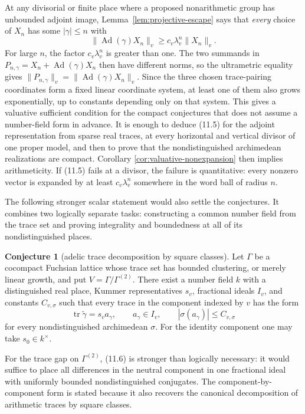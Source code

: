 \documentclass[11pt,reqno]{amsart}
\theoremstyle{definition}
\newtheorem{conjecture}[theorem]{Conjecture}
\theoremstyle{remark}
\newcommand{\Tr}{\operatorname{tr}}
\newcommand{\Ad}{\operatorname{Ad}}
\begin{document}
At any divisorial or finite place where a proposed nonarithmetic group has
unbounded adjoint image, Lemma~\ref{lem:projective-escape} says that
\emph{every} choice of
\(X_n\) has some \(|\gamma|\le n\) with
\[
 \|\Ad(\gamma)X_n\|_v\ge c_v\lambda_v^n\|X_n\|_v.
\]
For large \(n\), the factor \(c_v\lambda_v^n\) is greater than one.  The two
summands in
\(P_{n,\gamma}=X_n+\Ad(\gamma)X_n\) then have different norms, so the
ultrametric equality gives
\(\|P_{n,\gamma}\|_v=\|\Ad(\gamma)X_n\|_v\).  Since the three chosen
trace-pairing coordinates form a fixed linear coordinate system, at least
one of them
also grows exponentially, up to constants depending only on that system.
This gives a valuative sufficient condition for the compact conjectures that
does not assume a number-field form in advance.  It is enough to deduce
(11.5) for the adjoint representation from sparse real traces, at every
horizontal and vertical divisor of one proper model, and then to prove that
the nondistinguished archimedean realizations are compact.  Corollary
\ref{cor:valuative-nonexpansion} then implies arithmeticity.  If (11.5)
fails at a divisor, the failure is quantitative: every nonzero vector is
expanded by at least \(c_v\lambda_v^n\) somewhere in the word ball of
radius \(n\).

The following stronger scalar statement would also settle the conjectures.
It combines two logically separate tasks: constructing a common number
field from the trace set and proving integrality and boundedness at all of
its nondistinguished places.

\begin{conjecture}[adelic trace decomposition by square classes]\label{conj:window}
Let \(\Gamma\) be a cocompact Fuchsian lattice whose trace set has bounded
clustering, or merely linear growth, and put
\(V=\Gamma/\Gamma^{(2)}\).  There exist a number field \(k\) with a
distinguished real place, Kummer representatives \(s_v\), fractional ideals
\(I_v\), and constants \(C_{v,\sigma}\) such that every trace in the
component indexed by \(v\)
has the form
\[
 \Tr\widetilde\gamma=s_v a_\gamma,
 \qquad a_\gamma\in I_v,
 \qquad |\sigma(a_\gamma)|\le C_{v,\sigma}
\tag{11.6}
\]
for every nondistinguished archimedean \(\sigma\).  For the identity
component one
may take \(s_0\in k^\times\).
\end{conjecture}

For the trace gap on \(\Gamma^{(2)}\), (11.6) is stronger than logically
necessary: it would suffice to place all differences in the neutral
component in one fractional ideal with uniformly bounded nondistinguished
conjugates.  The component-by-component form is stated because it also
recovers the canonical decomposition of arithmetic traces by square classes.
\end{document}
